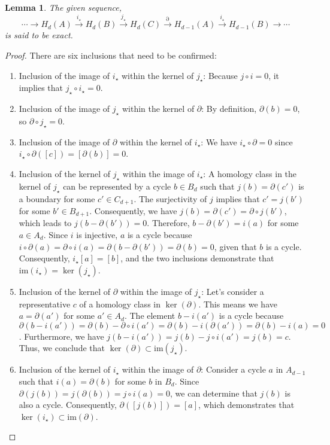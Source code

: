 \documentclass{amsart}
\newtheorem{lemma}[definition]{Lemma}
\begin{document}
\begin{lemma}
\label{exacthomsequence}
The given sequence,
\begin{equation*}
\cdots \rightarrow H_d(A) \xrightarrow{i_\star} H_d(B) \xrightarrow{j_\star} H_d(C) \xrightarrow{\partial} H_{d-1}(A) \xrightarrow{i_\star} H_{d-1}(B) \rightarrow \cdots
\end{equation*}
is said to be exact.
\end{lemma}

\begin{proof}
There are six inclusions that need to be confirmed:
\begin{enumerate}
	\item Inclusion of the image of $i_\star$ within the kernel of $j_\star$: Because $j\circ i = 0$, it implies that $j_\star \circ i_\star = 0$.
	\item Inclusion of the image of $j_\star$ within the kernel of $\partial$: By definition, $\partial(b) = 0$, so $\partial \circ j_\star = 0$.
	\item Inclusion of the image of $\partial$ within the kernel of $i_\star$: We have $i_\star \circ \partial = 0$ since $i_\star \circ \partial([c]) = [\partial(b)] = 0$.
	\item Inclusion of the kernel of $j_\star$ within the image of $i_\star$: A homology class in the kernel of $j_\star$ can be represented by a cycle $b \in B_d$ such that $j(b) = \partial(c')$ is a boundary for some $c' \in C_{d+1}$. The surjectivity of $j$ implies that $c' = j(b')$ for some $b' \in B_{d+1}$. Consequently, we have $j(b) = \partial(c') = \partial \circ j(b')$, which leads to $j(b - \partial(b')) = 0$. Therefore, $b - \partial(b') = i(a)$ for some $a \in A_d$. Since $i$ is injective, $a$ is a cycle because $i \circ \partial(a) = \partial \circ i(a) = \partial(b - \partial(b')) = \partial(b) = 0$, given that $b$ is a cycle. Consequently, $i_\star[a] = [b]$, and the two inclusions demonstrate that $\text{im}(i_\star) = \ker(j_\star)$.
	\item Inclusion of the kernel of $\partial$ within the image of $j_\star$: Let's consider a representative $c$ of a homology class in $\ker(\partial)$. This means we have $a = \partial(a')$ for some $a' \in A_d$. The element $b - i(a')$ is a cycle because $\partial(b - i(a')) = \partial(b) - \partial \circ i(a') = \partial(b) - i(\partial(a')) = \partial(b) - i(a) = 0$. Furthermore, we have $j(b - i(a')) = j(b) - j \circ i(a') = j(b) = c$. Thus, we conclude that $\ker(\partial) \subset \text{im}(j_\star)$.
	\item Inclusion of the kernel of $i_\star$ within the image of $\partial$: Consider a cycle $a$ in $A_{d-1}$ such that $i(a) = \partial(b)$ for some $b$ in $B_d$. Since $\partial(j(b)) = j(\partial(b)) = j \circ i(a) = 0$, we can determine that $j(b)$ is also a cycle. Consequently, $\partial([j(b)]) = [a]$, which demonstrates that $\ker(i_\star) \subset \text{im}(\partial)$.

\end{enumerate}
\end{proof}
\end{document}
